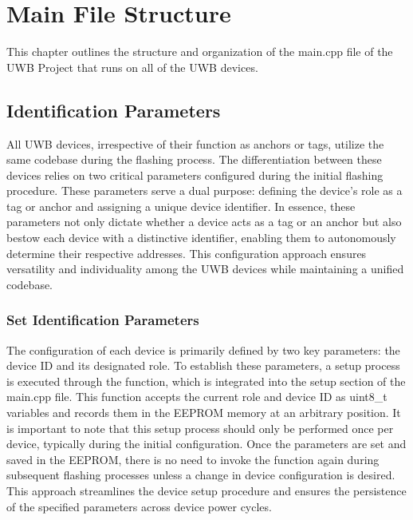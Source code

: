 \chapter{Main File Structure}
This chapter outlines the structure and organization of the main.cpp file of the UWB Project that runs on all of the UWB devices.

\section{Identification Parameters}
All UWB devices, irrespective of their function as anchors or tags, utilize the same codebase during the flashing process. 
The differentiation between these devices relies on two critical parameters configured during the initial flashing procedure. 
These parameters serve a dual purpose: defining the device's role as a tag or anchor and assigning a unique device identifier.
\vspace{4pt}
\newline
In essence, these parameters not only dictate whether a device acts as a tag or an anchor but also bestow each device with a distinctive identifier, enabling them to autonomously determine their respective addresses. 
This configuration approach ensures versatility and individuality among the UWB devices while maintaining a unified codebase.

\subsection{Set Identification Parameters}
The configuration of each device is primarily defined by two key parameters: the device ID and its designated role. 
To establish these parameters, a setup process is executed through the  function, which is integrated into the setup section of the main.cpp file. 
This function accepts the current role and device ID as uint8\_t variables and records them in the EEPROM memory at an arbitrary position.
\vspace{4pt}
\newline
It is important to note that this setup process should only be performed once per device, typically during the initial configuration. 
Once the parameters are set and saved in the EEPROM, there is no need to invoke the  function again during subsequent flashing processes unless a change in device configuration is desired. 
This approach streamlines the device setup procedure and ensures the persistence of the specified parameters across device power cycles.


